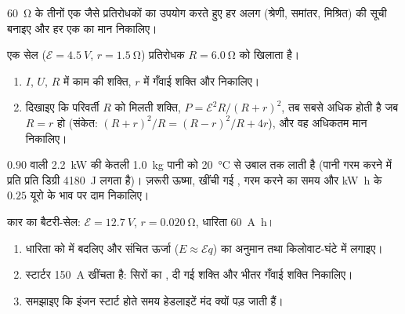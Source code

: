 \begin{exercise}[$\star\star\star$]\label{exo:g11:circuits-and-power:12}
\qty{60}{\ohm} के तीनों एक जैसे प्रतिरोधकों का उपयोग करते हुए हर अलग
 (श्रेणी, समांतर, मिश्रित) की सूची बनाइए और हर एक का
मान निकालिए।
\end{exercise}

\begin{exercise}[$\star\star\star$]\label{exo:g11:circuits-and-power:13}
एक सेल ($\mathcal{E} = \qty{4.5}{V}$, $r = \qty{1.5}{\ohm}$) प्रतिरोधक $R = \qty{6.0}{\ohm}$ को खिलाता है।
\begin{enumerate}
  \item $I$, $U$, $R$ में काम की शक्ति, $r$ में
        गँवाई शक्ति और  निकालिए।
  \item दिखाइए कि परिवर्ती $R$ को मिलती शक्ति, $P = \mathcal{E}^2 R/(R+r)^2$, तब
        सबसे अधिक होती है जब $R = r$ हो (संकेत: $(R+r)^2/R = (R-r)^2/R + 4r$), और वह अधिकतम मान
        निकालिए।
\end{enumerate}
\end{exercise}

\begin{exercise}[$\star\star\star$]\label{exo:g11:circuits-and-power:14}
 $0.90$ वाली \qty{2.2}{kW} की केतली \qty{1.0}{kg} पानी को \qty{20}{\degreeCelsius} से
उबाल तक लाती है (पानी गरम करने में प्रति  प्रति डिग्री
\qty{4180}{J} लगता है)। ज़रूरी ऊष्मा, खींची गई , गरम करने का
समय और \unit{kW.h} के $0.25$ यूरो के भाव पर दाम निकालिए।
\end{exercise}

\begin{exercise}[$\star\star\star$]\label{exo:g11:circuits-and-power:15}
कार का बैटरी-सेल: $\mathcal{E} = \qty{12.7}{V}$, $r = \qty{0.020}{\ohm}$, धारिता \qty{60}{A.h}।
\begin{enumerate}
  \item धारिता को  में बदलिए और संचित ऊर्जा ($E \approx \mathcal{E} q$)
        का अनुमान  तथा किलोवाट-घंटे में लगाइए।
  \item स्टार्टर \qty{150}{A} खींचता है: सिरों का , दी गई
        शक्ति और भीतर गँवाई शक्ति निकालिए।
  \item समझाइए कि इंजन स्टार्ट होते समय हेडलाइटें मंद क्यों पड़ जाती हैं।
\end{enumerate}
\end{exercise}

